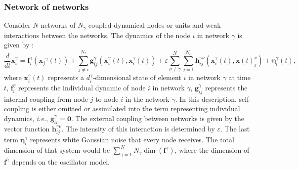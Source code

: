 \documentclass[../main.tex]{subfiles}
\begin{document}
\subsubsection{Network of networks}
Consider $N$ networks of $N_\gamma$ coupled dynamical nodes or units and weak interactions between the networks.
The dynamics of the node $i$ in network $\gamma$ is given by \citep{kirst_dynamic_2016}:
\begin{equation}
    \displaystyle\frac{d}{dt}\mathbf{x}_i^{\gamma} = \mathbf{f}_i^{\gamma}(\mathbf{x}_j{^\gamma}(t)) + \displaystyle\sum_{j\neq i}^{N_\gamma} \mathbf{g}_{ij}^\gamma(\mathbf{x}_i^\gamma(t),\mathbf{x}_i^\gamma(t)) + \varepsilon\displaystyle\sum_{\nu\neq\gamma}^{N}\displaystyle\sum_{j=1}^{N_\nu}\mathbf{h}_{ij}^{\gamma\nu}(\mathbf{x}_i^\gamma(t),\mathbf{x}(t)_j^\nu) + \mathbf{\eta}_i^\gamma(t),
    \label{eq:generic-network-of-networks}
\end{equation}
where $\mathbf{x}_i^{\gamma}(t)$ represents a $d_i^\gamma$-dimensional state of element $i$ in network $\gamma$ at time $t$, $\mathbf{f}_i^{\gamma}$ represents the individual dynamic of node $i$ in network $\gamma$, $\mathbf{g}_{ij}^{\gamma}$ represents the internal coupling from node $j$ to node $i$ in the network $\gamma$.
In this description, self-coupling is either omitted or assimilated into the term representing individual dynamics, \textit{i.e.}, $\mathbf{g}_{ii}^{\gamma} = \mathbf{0}$. 
The external coupling between networks is given by the vector function $\mathbf{h}_{ij}^{\gamma\nu}$.
The intensity of this interaction is determined by $\varepsilon$. 
The last term $\mathbf{\eta}_i^\gamma$ represents white Gaussian noise that every node receives.
The total dimension of that system would be $\sum_{\gamma=1}^{N}N_{\gamma}\dim(\mathbf{f}^{\gamma})$, where the dimension of $\mathbf{f}^{\gamma}$ depends on the oscillator model.
\end{document}
